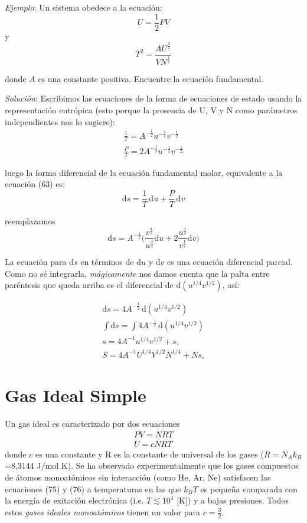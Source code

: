 \documentclass[10pt,twocolumn]{IEEEtran2e}
\newcommand{\ud}{\mathrm{d}}
\begin{document}
\textit{Ejemplo}: Un sistema obedece a la ecuaci\'on:
\begin{equation}
 U=\frac{1}{2}PV
\end{equation}
y
\begin{equation}
 T^{2}=\frac{AU^{\frac{3}{2}}}{VN^{\frac{1}{2}}}
\end{equation}

donde $A$ es una constante positiva. Encuentre la ecuaci\'on fundamental.

\textit{Soluci\'on}: Escribimos las ecuaciones de la forma de ecuaciones de estado usando la representaci\'on entr\'opica (esto porque la presencia de U, V y N como par\'ametros independientes nos lo sugiere):
\begin{eqnarray}
 \frac{1}{T}=A^{-\frac{1}{2}} u^{-\frac{3}{4}} v^{-\frac{1}{2}} \\
 \frac{P}{T}=2A^{-\frac{1}{2}} u^{-\frac{1}{4}} v^{-\frac{1}{2}} 
\end{eqnarray}

luego la forma diferencial de la ecuaci\'on fundamental molar, equivalente a la ecuaci\'on (63) es:
\begin{equation}
 \ud s = \frac{1}{T}\, \ud u + \frac{P}{T} \, \ud v
\end{equation}

reemplazamos
\begin{equation}
 \ud s = A^{-\frac{1}{2}} \bigg(\frac{v^{\frac{1}{2}}}{u^{\frac{3}{4}}}\ud u + 2\frac{u^{\frac{1}{2}}}{v^{\frac{1}{2}}}\ud v  \bigg) 
\end{equation}

La ecuaci\'on para $\ud s$ en t\'erminos de $\ud u$ y $\ud v$ es una ecuaci\'on diferencial parcial. Como no s\'e integrarla, \textit{m\'agicamente} nos damos cuenta que la palta entre par\'entesis que queda arriba es el diferencial de $\ud (u^{1/4}v^{1/2}) $, as\'i:

\begin{eqnarray}
 \ud s = 4 A^{-\frac{1}{2}} \,\ud(u^{1/4}v^{1/2}) \\
\int \ud s = \int 4 A^{-\frac{1}{2}} \,\ud(u^{1/4}v^{1/2})\\
s = 4 A^{-1} u^{1/4}v^{1/2} + s_{\circ} \\
S = 4 A^{-1} U^{1/4} V^{1/2} N^{1/4} + Ns_{\circ}
\end{eqnarray}

\section{Gas Ideal Simple}
Un gas ideal es caracterizado por dos ecuaciones
\begin{eqnarray}
 PV=NRT\\
 U=cNRT
\end{eqnarray}
donde $c$ es una constante y R es la constante de universal de los gases  ($R=N_{A}k_{B}$=8,3144 J/mol K).
Se ha observado experimentalmente que los gases compuestos de \'atomos monoat\'omicos sin interacci\'on (como He, Ar, Ne) satisfacen las ecuaciones (75) y (76) a temperaturas en las que $k_{B}T$  es peque\~na comparada con la energ\'ia de exitaci\'on electr\'onica (i.e. $T\lesssim 10^{4}$ [K]) y a bajas presiones. Todos estos \textit{gases ideales monoat\'omicos} tienen un valor para $c=\frac{3}{2}$.
\end{document}

